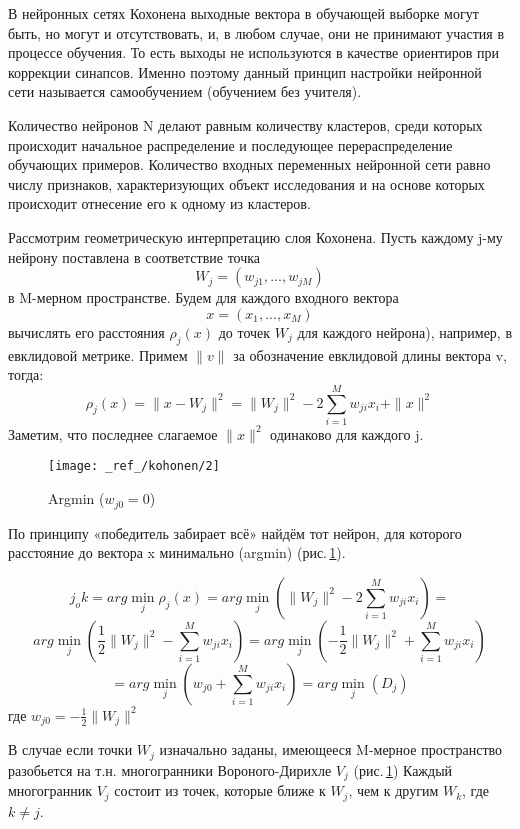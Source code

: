 \documentclass[12pt,a4paper]{article}
\begin{document}
В нейронных сетях Кохонена выходные вектора в обучающей выборке могут быть, но могут и отсутствовать, и, в любом случае, они не принимают участия в процессе обучения. То есть выходы не используются в качестве ориентиров при коррекции синапсов. Именно поэтому данный принцип настройки нейронной сети называется самообучением (обучением без учителя). 

Количество нейронов N делают равным количеству кластеров, среди которых происходит начальное распределение и последующее перераспределение обучающих примеров. Количество входных переменных нейронной сети равно числу признаков, характеризующих объект исследования и на основе которых происходит отнесение его к одному из кластеров.


Рассмотрим геометрическую интерпретацию слоя Кохонена.
Пусть каждому j-му нейрону поставлена в соответствие точка 
$$W_j = (w_{j1}, ..., w_{jM})$$
в M-мерном пространстве. Будем для каждого входного вектора 
$$x = (x_1, ..., x_M)$$
вычислять его расстояния $\rho_{j}(x)$ до точек $W_j$ для каждого нейрона), например, в евклидовой метрике. Примем $\|v\|$ за обозначение евклидовой длины вектора v, тогда:
$$\rho_{j}(x) = \|x-W_j\|^{2} = \|W_j\|^2 - 2
\sum\limits_{i=1}^{M} w_{ji} x_i + \|x\|^{2}$$
Заметим, что последнее слагаемое $\|x\|^{2}$ одинаково для каждого j.

\begin{figure}[h!]
	\centering
	\texttt{[image: \_ref\_/kohonen/2]}
	\caption{Argmin ($w_{j0} = 0$)\label{fig:02}}
\end{figure}

По принципу «победитель забирает всё» найдём тот нейрон, для которого расстояние до вектора x минимально (argmin) (рис.\,\ref{fig:02}). 

\newpage

\[
j_ok = arg\min_{j}\rho_{j}(x) = arg\min_{j}\left(
\|W_j\|^{2} - 2 \sum\limits_{i=1}^{M} w_{ji} x_i
\right) = 
\]
\[arg\min_{j}\left(
\frac{1}{2}\|W_j\|^{2} - \sum\limits_{i=1}^{M} w_{ji} x_i
\right) = 
arg\min_{j}\left(
- \frac{1}{2}\|W_j\|^{2} + \sum\limits_{i=1}^{M} w_{ji} x_i
\right)
\]
\[ = arg\min_{j}\left(
w_{j0} + \sum\limits_{i=1}^{M} w_{ji} x_i
\right) = arg\min_{j}(D_j)
\]
где $w_{j0} = - \frac{1}{2}\|W_j\|^{2}$


В случае если точки $W_j$ изначально заданы, имеющееся M-мерное пространство разобьется на т.н. многогранники Вороного-Дирихле $V_j$ (рис.\,\ref{fig:02}) Каждый многогранник $V_j$ состоит из точек, которые ближе к $W_j$, чем к другим $W_k$, где $k \neq j$.
\end{document}
